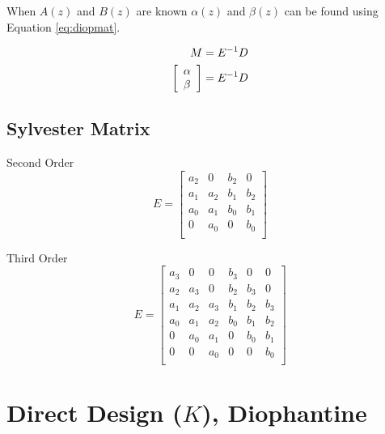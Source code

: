 \documentclass{article}
\begin{document}
When $A(z)$ and $B(z)$ are known $\alpha(z)$ and $\beta(z)$
can be found using Equation \ref{eq:diopmat}.

\begin{align}
	M &= E^{-1} D \label{eq:diopmat} \\
	\left[
	\begin{array}{l}
		\alpha \\
		\beta
	\end{array}
	\right] &= E^{-1} D \notag
\end{align}

\subsection{Sylvester Matrix}
\label{sec:sylvester}

Second Order
\[
E=
\begin{bmatrix}
	a_2 & 0 & b_2 & 0 \\
	a_1 & a_2 & b_1 & b_2 \\
	a_0 & a_1 & b_0 & b_1 \\
	0 & a_0 & 0 & b_0 \\
\end{bmatrix}
\]

Third Order
\[
E=
\begin{bmatrix}
	a_3 & 0 & 0 & b_3 & 0 & 0 \\
	a_2 & a_3 & 0 & b_2 & b_3 & 0 \\
	a_1 & a_2 & a_3 & b_1 & b_2 & b_3 \\
	a_0 & a_1 & a_2 & b_0 & b_1 & b_2 \\
	0 & a_0 & a_1 & 0 & b_0 & b_1 \\
	0 & 0 & a_0 & 0 & 0 & b_0 \\
\end{bmatrix}
\]


\clearpage
\section{Direct Design ($K$), Diophantine}
\label{sec:dd}
\end{document}
